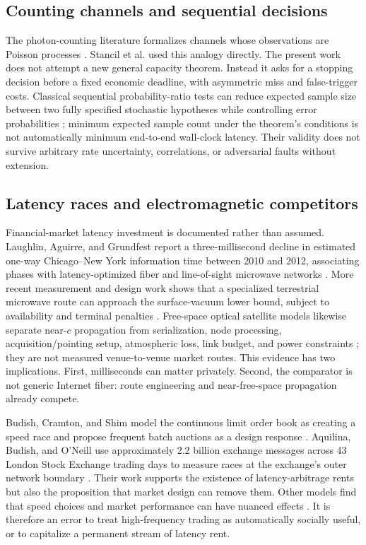 \documentclass[11pt]{article}
\begin{document}
\subsection{Counting channels and sequential decisions}

The photon-counting literature formalizes channels whose observations are Poisson processes \citep{Kabanov1978,Pierce1981}. Stancil et al. used this analogy directly. The present work does not attempt a new general capacity theorem. Instead it asks for a stopping decision before a fixed economic deadline, with asymmetric miss and false-trigger costs. Classical sequential probability-ratio tests can reduce expected sample size between two fully specified stochastic hypotheses while controlling error probabilities \citep{Wald1945,WaldWolfowitz1948}; minimum expected sample count under the theorem's conditions is not automatically minimum end-to-end wall-clock latency. Their validity does not survive arbitrary rate uncertainty, correlations, or adversarial faults without extension.

\subsection{Latency races and electromagnetic competitors}

Financial-market latency investment is documented rather than assumed. Laughlin, Aguirre, and Grundfest report a three-millisecond decline in estimated one-way Chicago--New York information time between 2010 and 2012, associating phases with latency-optimized fiber and line-of-sight microwave networks \citep{Laughlin2014}. More recent measurement and design work shows that a specialized terrestrial microwave route can approach the surface-vacuum lower bound, subject to availability and terminal penalties \citep{Bhattacherjee2022}. Free-space optical satellite models likewise separate near-$c$ propagation from serialization, node processing, acquisition/pointing setup, atmospheric loss, link budget, and power constraints \citep{Liang2023FSO}; they are not measured venue-to-venue market routes. This evidence has two implications. First, milliseconds can matter privately. Second, the comparator is not generic Internet fiber: route engineering and near-free-space propagation already compete.

Budish, Cramton, and Shim model the continuous limit order book as creating a speed race and propose frequent batch auctions as a design response \citep{Budish2015}. Aquilina, Budish, and O'Neill use approximately 2.2 billion exchange messages across 43 London Stock Exchange trading days to measure races at the exchange's outer network boundary \citep{Aquilina2022}. Their work supports the existence of latency-arbitrage rents but also the proposition that market design can remove them. Other models find that speed choices and market performance can have nuanced effects \citep{Baldauf2020}. It is therefore an error to treat high-frequency trading as automatically socially useful, or to capitalize a permanent stream of latency rent.
\end{document}
